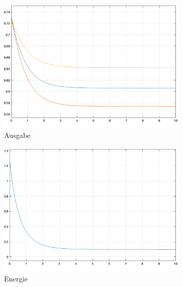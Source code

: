 \begin{figure}[h]
  \caption{Dritte Simulation des \ac{hnn}}
  \centering
  \begin{subfigure}[b]{0.32\textwidth}
    \includegraphics[width=\textwidth]{abbildungen/hnn_simulation_3_ausgabe.png}
    \caption{Ausgabe}
  \end{subfigure}%
  \hfill
  \begin{subfigure}[b]{0.32\textwidth}
    \includegraphics[width=\textwidth]{abbildungen/hnn_simulation_3_energiefunktion.png}
    \caption{Energie}
  \end{subfigure}%
  \hfill
  \begin{subfigure}[b]{0.32\textwidth}

\end{subfigure}
\end{figure}
